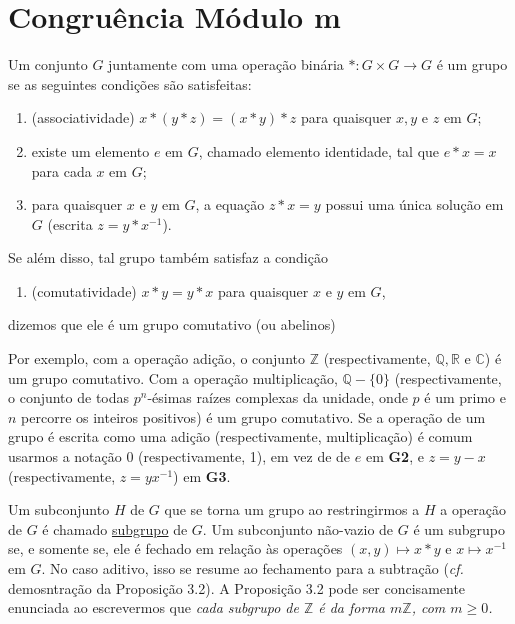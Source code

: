 \vspace{1.5cm}
\section{Congruência Módulo m}

\begin{definicao}
Um conjunto $G$ juntamente com uma operação binária $*: G \times G \to G$ é um grupo se as seguintes
condições são satisfeitas:
    \begin{enumerate}[label=\textbf{G\arabic*.}, left=0.5cm, align=left, nosep]
        \item (associatividade) $x * (y * z) = (x * y) * z$ para quaisquer $x,y \text{ e } z$
        em $G$;
        \item existe um elemento $e$ em $G$, chamado elemento identidade, tal que $e * x = x$ 
        para cada $x$ em $G$;
        \item para quaisquer $x$ e $y$ em $G$, a equação $z * x = y$ possui uma única solução
        em $G$ (escrita $z = y * x^{-1}$).
    \end{enumerate}      
    Se além disso, tal grupo também satisfaz a condição 
    \begin{enumerate}[label=\textbf{G4.}, left=0.5cm, align=left, nosep]
        \item (comutatividade) $x * y = y * x$ para quaisquer $x$ e $y$ em $G$,  
    \end{enumerate}    
    dizemos que ele é um grupo comutativo (ou abelinos)
\end{definicao}

Por exemplo, com a operação adição, o conjunto $\mathbb{Z}$ (respectivamente, $\mathbb{Q}, \mathbb{R}$ e 
$\mathbb{C}$) é um grupo comutativo. Com a operação multiplicação, $\mathbb{Q} - \{0\}$ (respectivamente, o 
conjunto de todas $p^n$-ésimas raízes complexas da unidade, onde $p$ é um primo e $n$ percorre os inteiros positivos)
é um grupo comutativo. Se a operação de um grupo é escrita como uma adição (respectivamente, multiplicação) é comum
usarmos a notação 0 (respectivamente, 1), em vez de de $e$ em \textbf{G2}, e $z = y - x$ (respectivamente, $z = y x^{-1}$)
em \textbf{G3}.

Um subconjunto $H$ de $G$ que se torna um grupo ao restringirmos a $H$ a operação de $G$ é chamado \underline{subgrupo} de $G$.
Um subconjunto não-vazio de $G$ é um subgrupo se, e somente se, ele é fechado em relação às operações $(x,y) \mapsto x * y$ e 
$x \mapsto x^{-1}$ em $G$. No caso aditivo, isso se resume ao fechamento para a subtração (\emph{cf.} demosntração da Proposição 3.2).
A Proposição 3.2 pode ser concisamente enunciada ao escrevermos que \emph{cada subgrupo de $\mathbb{Z}$ é da forma $m\mathbb{Z}$, 
com $m \ge 0$.}

